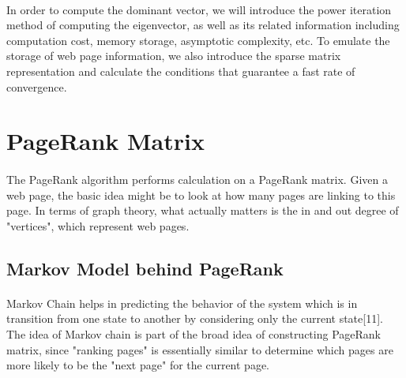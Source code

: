 \documentclass[12pt]{article}
\begin{document}
\paragraph{} In order to compute the dominant vector, we will introduce the power iteration method of computing the eigenvector, as well as its related information including computation cost, memory storage, asymptotic complexity, etc. To emulate the storage of web page information, we also introduce the sparse matrix representation and calculate the conditions that guarantee a fast rate of convergence.

\section{PageRank Matrix}
\paragraph{} The PageRank algorithm performs calculation on a PageRank matrix. Given a web page, the basic idea might be to look at how many pages are linking to this page. In terms of graph theory, what actually matters is the in and out degree of "vertices", which represent web pages. 

\subsection{Markov Model behind PageRank}
\paragraph{} Markov Chain helps in predicting the behavior of the system which is in transition from one state to another by considering only the current state[11]. The idea of Markov chain is part of the broad idea of constructing PageRank matrix, since "ranking pages" is essentially similar to determine which pages are more likely to be the "next page" for the current page.
\end{document}
